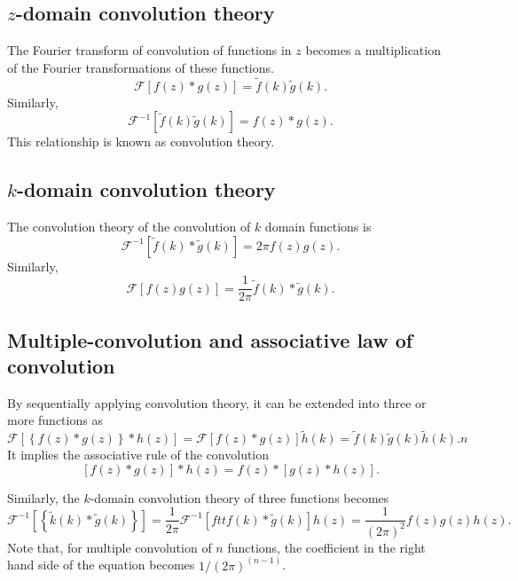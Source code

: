 \documentclass[a4paper]{article}
\newcommand{\ftf}[1]{{\mathcal{F}\left[#1\right]\xspace}}
\newcommand{\iftf}[1]{{\mathcal{F}^{-1}\left[#1\right]\xspace}}
\newcommand{\ftt}[1]{{\tilde{#1}\xspace}}
\begin{document}
\subsection*{$z$-domain convolution theory}
The Fourier transform of convolution of functions in $z$ becomes a multiplication of the Fourier transformations of these functions.
\begin{equation}
	\ftf{f(z)*g(z)} = \ftt{f}(k) \ftt{g}(k).
\end{equation}
Similarly,
\begin{equation}
	\iftf{\ftt{f}(k)\ftt{g}(k)} = f(z)*g(z).
\end{equation}
This relationship is known as convolution theory.

\subsection*{$k$-domain convolution theory}
The convolution theory of the convolution of $k$ domain functions is
\begin{equation}
	\iftf{\ftt{f}(k)*\ftt{g}(k)} = 2\pi f(z) g(z).
\end{equation}
Similarly,
\begin{equation}
	\ftf{{f}(z)g(z)} = \frac{1}{2\pi}\ftt{f}(k)*\ftt{g}(k).
\end{equation}
\subsection*{Multiple-convolution and associative law of convolution}
By sequentially applying convolution theory, it can be extended into three or more functions as
\begin{equation}
	\ftf{\left\{f(z) * g(z)\right\} * h(z)}
	 = \ftf{f(z) * g(z)}\ftt{h}(k) = \ftt{f}(k)\ftt{g}(k)\ftt{h}(k).n
\end{equation}
It implies the associative rule of the convolution
\begin{equation}
	\left[f(z)*g(z)\right]*h(z)=f(z)*\left[g(z)*h(z)\right].
\end{equation}

Similarly, the $k$-domain convolution theory of three functions becomes
\begin{equation}
	\iftf{\left\{\ftt{k}(k)* \ftt{g}(k)\right\}}
	= \frac{1}{2\pi}\iftf{ftt{f}(k)*\ftt{g}(k)}h(z) = \frac{1}{\left(2\pi\right)^2}f(z)g(z)h(z).
\end{equation}
Note that, for multiple convolution of $n$ functions, the coefficient in the right hand side of the equation becomes $1/(2\pi)^{(n-1)}$.
\end{document}
